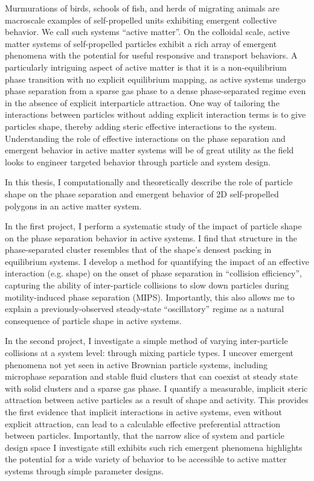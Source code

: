 
Murmurations of birds, schools of fish, and herds of migrating animals are macroscale examples of self-propelled units exhibiting emergent collective behavior. We call such systems ``active matter''. On the colloidal scale, active matter systems of self-propelled particles exhibit a rich array of emergent phenomena with the potential for useful responsive and transport behaviors. A particularly intriguing aspect of active matter is that it is a non-equilibrium phase transition with no explicit equilibrium mapping, as active systems undergo phase separation from a sparse gas phase to a dense phase-separated regime even in the absence of explicit interparticle attraction. One way of tailoring the interactions between particles without adding explicit interaction terms is to give particles shape, thereby adding steric effective interactions to the system. Understanding the role of effective interactions on the phase separation and emergent behavior in active matter systems will be of great utility as the field looks to engineer targeted behavior through particle and system design.

In this thesis, I computationally and theoretically describe the role of particle shape on the phase separation and emergent behavior of 2D self-propelled polygons in an active matter system.

In the first project, I perform a systematic study of the impact of particle shape on the phase separation behavior in active systems. I find that structure in the phase-separated cluster resembles that of the shape's densest packing in equilibrium systems. I develop a method for quantifying the impact of an effective interaction (e.g. shape) on the onset of phase separation in ``collision efficiency'', capturing the ability of inter-particle collisions to slow down particles during motility-induced phase separation (MIPS). Importantly, this also allows me to explain a previously-observed steady-state ``oscillatory'' regime as a natural consequence of particle shape in active systems.

In the second project, I investigate a simple method of varying inter-particle collisions at a system level: through mixing particle types. I uncover emergent phenomena not yet seen in active Brownian particle systems, including microphase separation and stable fluid clusters that can coexist at steady state with solid clusters and a sparse gas phase. I quantify a measurable, implicit steric attraction between active particles as a result of shape and activity. This provides the first evidence that implicit interactions in active systems, even without explicit attraction, can lead to a calculable effective preferential attraction between particles. Importantly, that the narrow slice of system and particle design space I investigate still exhibits such rich emergent phenomena highlights the potential for a wide variety of behavior to be accessible to active matter systems through simple parameter designs.

